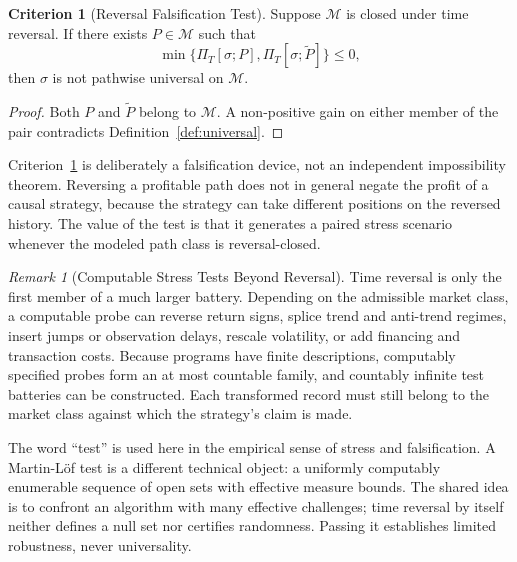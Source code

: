 \documentclass[aps,pra,reprint,superscriptaddress,amsmath,amssymb,floatfix]{revtex4-2}
\theoremstyle{plain}
\theoremstyle{definition}
\newtheorem{criterion}{Criterion}
\theoremstyle{remark}
\newtheorem{remark}{Remark}
\begin{document}
\begin{criterion}[Reversal Falsification Test]
  \label{crit:tr}
  Suppose \(\mathcal{M}\) is closed under time reversal. If there exists
  \(P\in\mathcal{M}\) such that
  \begin{equation}
    \min\{\Pi_T[\sigma;P],\Pi_T[\sigma;\widetilde P]\}\leq 0,
    \label{eq:reversaltest}
  \end{equation}
  then \(\sigma\) is not pathwise universal on \(\mathcal{M}\).
\end{criterion}

\begin{proof}
Both \(P\) and \(\widetilde P\) belong to \(\mathcal{M}\). A non-positive gain
on either member of the pair contradicts Definition~\ref{def:universal}.
\end{proof}

Criterion~\ref{crit:tr} is deliberately a falsification device, not an
independent impossibility theorem. Reversing a profitable path does not in
general negate the profit of a causal strategy, because the strategy can take
different positions on the reversed history. The value of the test is that it
generates a paired stress scenario whenever the modeled path class is
reversal-closed.

\begin{remark}[Computable Stress Tests Beyond Reversal]
\label{rem:stressfamily}
Time reversal is only the first member of a much larger battery. Depending on
the admissible market class, a computable probe can reverse return signs,
splice trend and anti-trend regimes, insert jumps or observation delays,
rescale volatility, or add financing and transaction costs. Because programs
have finite descriptions, computably specified probes form an at most
countable family, and countably infinite test batteries can be constructed.
Each transformed record must still belong to the market class against which
the strategy's claim is made.

The word ``test'' is used here in the empirical sense of stress and
falsification. A Martin-L\"of test is a different technical object: a uniformly
computably enumerable sequence of open sets with effective measure bounds.
The shared idea is to confront an algorithm with many effective challenges;
time reversal by itself neither defines a null set nor certifies randomness.
Passing it establishes limited robustness, never universality.
\end{remark}
\end{document}
